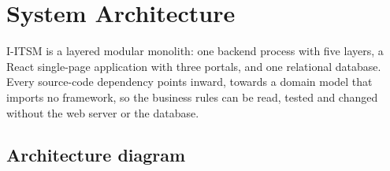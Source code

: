 \chapter{System Architecture}\label{ch:architecture}

I-ITSM is a layered modular monolith: one backend process with five layers, a React single-page
application with three portals, and one relational database. Every source-code dependency
points inward, towards a domain model that imports no framework, so the business rules can be
read, tested and changed without the web server or the database.

\section{Architecture diagram}

